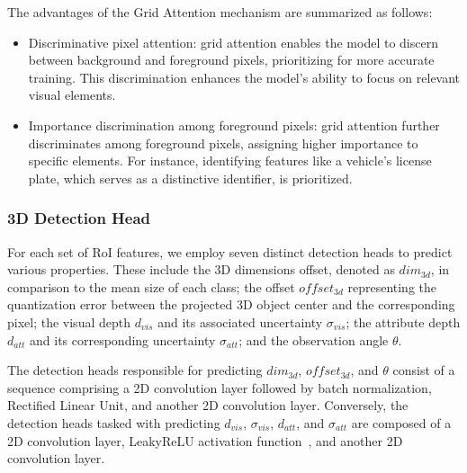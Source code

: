 \documentclass[journal]{IEEEtran}
\begin{document}
	The advantages of the Grid Attention mechanism are summarized as follows:
	\begin{itemize}
		\item Discriminative pixel attention: grid attention enables the model to discern between background and foreground pixels, prioritizing for more accurate training. This discrimination enhances the model's ability to focus on relevant visual elements.
		\item Importance discrimination among foreground pixels: grid attention further discriminates among foreground pixels, assigning higher importance to specific elements. For instance, identifying features like a vehicle's license plate, which serves as a distinctive identifier, is prioritized.
	\end{itemize}
	
	

	
	\subsubsection{3D Detection Head}\label{3d_detection_head}
	
	For each set of RoI features, we employ seven distinct detection heads to predict various properties. These include the 3D dimensions offset, denoted as $dim_{3d}$, in comparison to the mean size of each class; the offset $offset_{3d}$ representing the quantization error between the projected 3D object center and the corresponding pixel; the visual depth $d_{vis}$ and its associated uncertainty $\sigma_{vis}$; the attribute depth $d_{att}$ and its corresponding uncertainty $\sigma_{att}$; and the observation angle $\theta$.
	
	The detection heads responsible for predicting $dim_{3d}$, $offset_{3d}$, and $\theta$ consist of a sequence comprising a 2D convolution layer followed by batch normalization, Rectified Linear Unit, and another 2D convolution layer. Conversely, the detection heads tasked with predicting $d_{vis}$, $\sigma_{vis}$, $d_{att}$, and $\sigma_{att}$ are composed of a 2D convolution layer, LeakyReLU activation function~\cite{leaky-relu}, and another 2D convolution layer.
	
\end{document}
